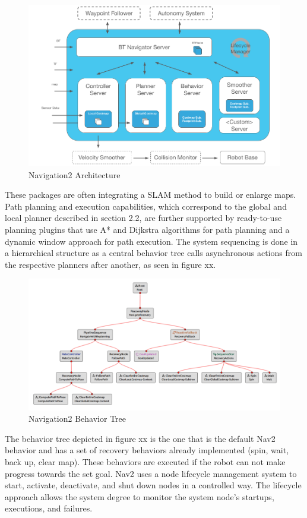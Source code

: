 \begin{figure}[h!]
	\includegraphics[width=1.0\textwidth]{images/nav2_architecture.png}
	\caption{Navigation2 Architecture \cite{macenski2020}}
\end{figure}
These packages are often integrating a SLAM method to build or enlarge maps. Path planning and execution capabilities, which correspond to the global and local planner described in section 2.2, are further supported by ready-to-use planning plugins that use A* and Dijkstra algorithms for path planning and a dynamic window approach for path execution. The system sequencing is done in a hierarchical structure as a central behavior tree calls asynchronous actions from the respective planners after another, as seen in figure xx. 

\begin{figure} [h!]
	\includegraphics[width=1.0\textwidth]{images/nav_bt-modified.png}
	\caption{Navigation2 Behavior Tree}
\end{figure}

The behavior tree depicted in figure xx is the one that is the default Nav2 behavior and has a set of recovery behaviors already implemented (spin, wait, back up, clear map). These behaviors are executed if the robot can not make progress towards the set goal. 
Nav2 uses a node lifecycle management system to start, activate, deactivate, and shut down nodes in a controlled way. The lifecycle approach allows the system degree to monitor the system node's startups, executions, and failures. 

